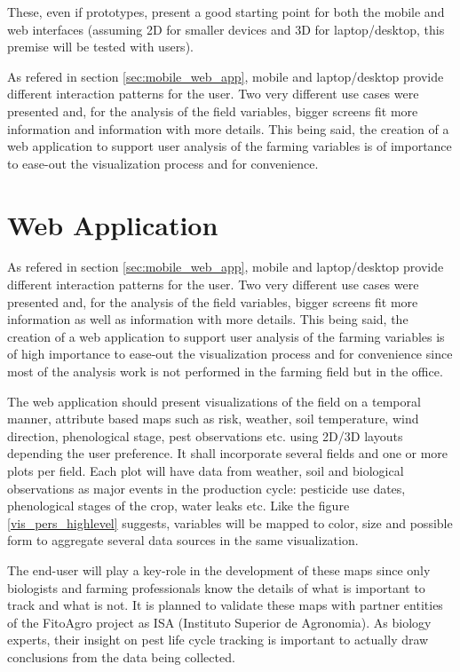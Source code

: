 These, even if prototypes, present a good starting point for both the mobile and web interfaces (assuming 2D for smaller devices and 3D for laptop/desktop, this premise will be tested with users). 

As refered in section \ref{sec:mobile_web_app}, mobile and laptop/desktop provide different interaction patterns for the user. Two very different use cases were presented and, for the analysis of the field variables, bigger screens fit more information and information with more details. This being said, the creation of a web application to support user analysis of the farming variables is of importance to ease-out the visualization process and for convenience.

\section{Web Application}

As refered in section \ref{sec:mobile_web_app}, mobile and laptop/desktop provide different interaction patterns for the user. Two very different use cases were presented and, for the analysis of the field variables, bigger screens fit more information as well as information with more details. This being said, the creation of a web application to support user analysis of the farming variables is of high importance to ease-out the visualization process and for convenience since most of the analysis work is not performed in the farming field but in the office.

The web application should present visualizations of the field on a temporal manner, attribute based maps such as risk, weather, soil temperature, wind direction, phenological stage, pest observations etc. using 2D/3D layouts depending the user preference. It shall incorporate several fields and one or more plots per field. Each plot will have data from weather, soil and biological observations as major events in the production cycle: pesticide use dates, phenological stages of the crop, water leaks etc. Like the figure \ref{vis_pers_highlevel} suggests, variables will be mapped to color, size and possible form to aggregate several data sources in the same visualization.

The end-user will play a key-role in the development of these maps since only biologists and farming professionals know the details of what is important to track and what is not. It is planned to validate these maps with partner entities of the FitoAgro project as ISA (Instituto Superior de Agronomia). As biology experts, their insight on pest life cycle tracking is important to actually draw conclusions from the data being collected. 

